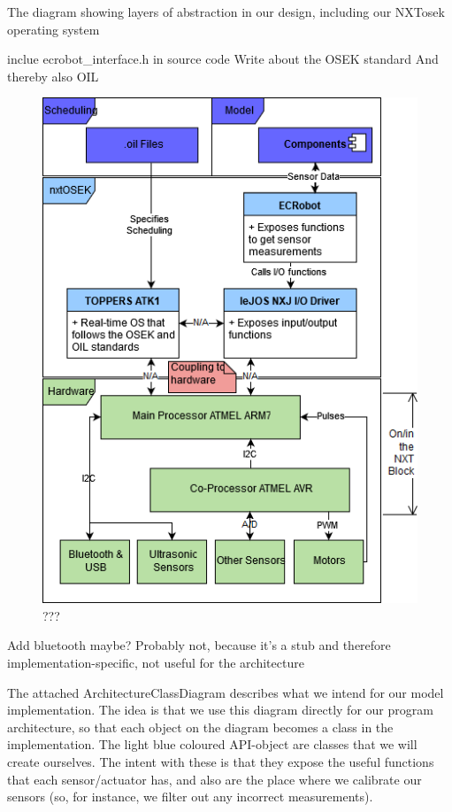 The diagram showing layers of abstraction in our design, including our NXTosek operating system

inclue ecrobot\_interface.h in source code
Write about the OSEK standard
And thereby also OIL
\begin{figure}[H]
    \includegraphics[width=\textwidth]{Images/Design/abstractionLayerDiagram.png}
    \caption{???}
\end{figure}

Add bluetooth maybe? Probably not, because it's a stub and therefore implementation-specific, not useful for the architecture


The attached ArchitectureClassDiagram describes what we intend for our model implementation. The idea is that we use this diagram directly for our program architecture, so that each object on the diagram becomes a class in the implementation. The light blue coloured API-object are classes that we will create ourselves. The intent with these is that they expose the useful functions that each sensor/actuator has, and also are the place where we calibrate our sensors (so, for instance, we filter out any incorrect measurements).

